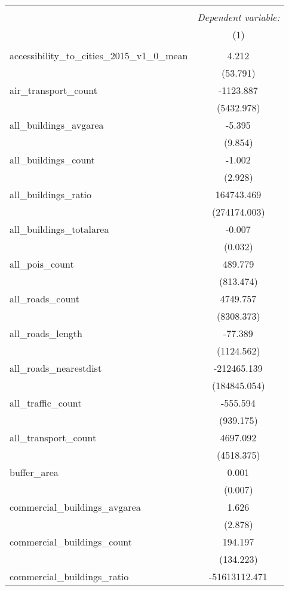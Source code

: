 \begin{table}[!htbp] \centering
\begin{tabular}{@{\extracolsep{5pt}}lc}
\\[-1.8ex]\hline
\hline \\[-1.8ex]
& \multicolumn{1}{c}{\textit{Dependent variable:}} \
\cr \cline{1-2}
\\[-1.8ex] & (1) \\
\hline \\[-1.8ex]
 accessibility_to_cities_2015_v1_0_mean & 4.212$^{}$ \\
  & (53.791) \\
 air_transport_count & -1123.887$^{}$ \\
  & (5432.978) \\
 all_buildings_avgarea & -5.395$^{}$ \\
  & (9.854) \\
 all_buildings_count & -1.002$^{}$ \\
  & (2.928) \\
 all_buildings_ratio & 164743.469$^{}$ \\
  & (274174.003) \\
 all_buildings_totalarea & -0.007$^{}$ \\
  & (0.032) \\
 all_pois_count & 489.779$^{}$ \\
  & (813.474) \\
 all_roads_count & 4749.757$^{}$ \\
  & (8308.373) \\
 all_roads_length & -77.389$^{}$ \\
  & (1124.562) \\
 all_roads_nearestdist & -212465.139$^{}$ \\
  & (184845.054) \\
 all_traffic_count & -555.594$^{}$ \\
  & (939.175) \\
 all_transport_count & 4697.092$^{}$ \\
  & (4518.375) \\
 buffer_area & 0.001$^{}$ \\
  & (0.007) \\
 commercial_buildings_avgarea & 1.626$^{}$ \\
  & (2.878) \\
 commercial_buildings_count & 194.197$^{}$ \\
  & (134.223) \\
 commercial_buildings_ratio & -51613112.471$^{}$ \\

\end{tabular}
\end{table}
